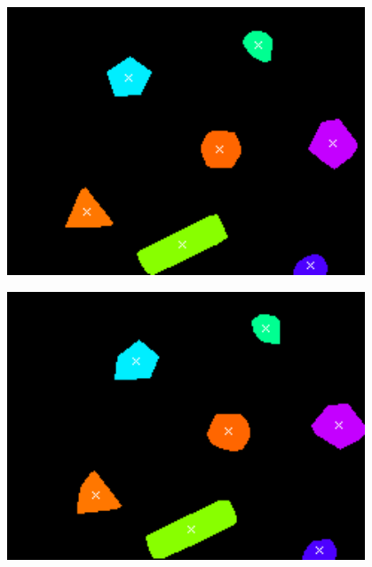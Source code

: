 \begin{figure}
    \centering
    \begin{minipage}{0.33\textwidth}
        \centering
        \includegraphics[width = 0.95\textwidth]{images/tracking1.png}
        \label{gra:tracking1}
    \end{minipage}\hfill
    \begin{minipage}{0.33\textwidth}
        \centering
        \includegraphics[width = 0.95\textwidth]{images/tracking2.png}
        \label{gra:tracking2}
    \end{minipage}\hfill
    \begin{minipage}{0.33\textwidth}
        \centering

\end{minipage}
\end{figure}
